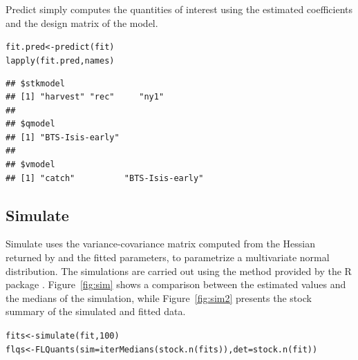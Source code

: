 \documentclass[a4paper,english,10pt]{article}\usepackage[]{graphicx}\usepackage[]{color}
\makeatletter
\newcommand{\hlnum}[1]{\textcolor[rgb]{0.063,0.58,0.627}{#1}}%
\newcommand{\hlstd}[1]{\textcolor[rgb]{0.196,0.196,0.196}{#1}}%
\newcommand{\hlkwb}[1]{\textcolor[rgb]{0.627,0,0.314}{#1}}%
\newcommand{\hlkwc}[1]{\textcolor[rgb]{0,0.631,0.314}{#1}}%
\newcommand{\hlkwd}[1]{\textcolor[rgb]{0.78,0.227,0.412}{#1}}%
\newenvironment{kframe}{%
 \def\at@end@of@kframe{}%
 \ifinner\ifhmode%
  \def\at@end@of@kframe{\end{minipage}}%
  \begin{minipage}{\columnwidth}%
 \fi\fi%
 \def\FrameCommand##1{\hskip\@totalleftmargin \hskip-\fboxsep
 \colorbox{shadecolor}{##1}\hskip-\fboxsep
     \hskip-\linewidth \hskip-\@totalleftmargin \hskip\columnwidth}%
 \MakeFramed {\advance\hsize-\width
   \@totalleftmargin\z@ \linewidth\hsize
   \@setminipage}}%
 {\par\unskip\endMakeFramed%
 \at@end@of@kframe}
\newenvironment{knitrout}{}{} %
\makeatother
\begin{document}
Predict simply computes the quantities of interest using the estimated coefficients and the design matrix of the model.

\begin{knitrout}
\color{fgcolor}\begin{kframe}
\begin{alltt}
\hlstd{fit.pred} \hlkwb{<-} \hlkwd{predict}\hlstd{(fit)}
\hlkwd{lapply}\hlstd{(fit.pred, names)}
\end{alltt}
\begin{verbatim}
## $stkmodel
## [1] "harvest" "rec"     "ny1"    
## 
## $qmodel
## [1] "BTS-Isis-early"
## 
## $vmodel
## [1] "catch"          "BTS-Isis-early"
\end{verbatim}
\end{kframe}
\end{knitrout}

\subsection{Simulate}

Simulate uses the variance-covariance matrix computed from the Hessian returned by  and the fitted parameters, to parametrize a multivariate normal distribution. The simulations are carried out using the method  provided by the R package \href{http://cran.r-project.org/web/packages/MASS/}{}. Figure~\ref{fig:sim} shows a comparison between the estimated values and the medians of the simulation, while Figure~\ref{fig:sim2} presents the stock summary of the simulated and fitted data.

\begin{knitrout}
\color{fgcolor}\begin{kframe}
\begin{alltt}
\hlstd{fits} \hlkwb{<-} \hlkwd{simulate}\hlstd{(fit,} \hlnum{100}\hlstd{)}
\hlstd{flqs} \hlkwb{<-} \hlkwd{FLQuants}\hlstd{(}\hlkwc{sim} \hlstd{=} \hlkwd{iterMedians}\hlstd{(}\hlkwd{stock.n}\hlstd{(fits)),} \hlkwc{det} \hlstd{=} \hlkwd{stock.n}\hlstd{(fit))}
\end{alltt}
\end{kframe}
\end{knitrout}
\end{document}
